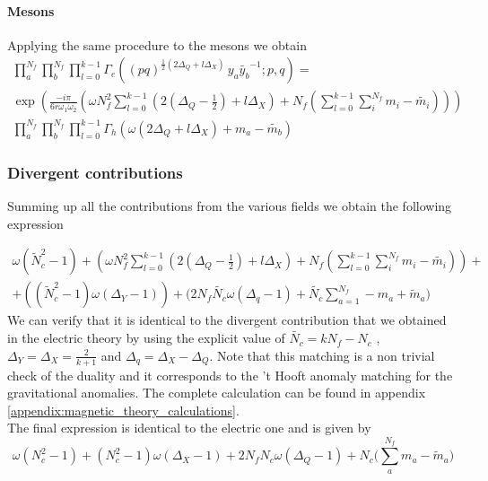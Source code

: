 \paragraph{Mesons}
Applying the same procedure to the mesons we obtain
\begin{multline}
\prod_a^{N_f} \prod_b^{N_f}  \prod_{l=0}^{k-1} \Gamma_e ( (pq)^{\frac{1}{2}\left( 2 \Delta_Q + l\Delta_X\right)} \, y_a \tilde{y_b}^{-1}; p ,q)  = \\
\exp \left( \frac{- i \pi }{6 r \omega_1 \omega_2} \left(  \omega  N_f^2 \sum _{l=0}^{k-1} \left(  2 \left( \Delta_Q - \frac{1}{2}\right) +  l \Delta_X   \right)  +N_f \left( \sum_{l=0}^{k-1} \sum_i^{N_f} m_i - \tilde{m_i}\right) \right) \right) \\
 \prod_a^{N_f} \prod_b^{N_f}  \prod_{l=0}^{k-1}  \Gamma_h \left( \omega ( 2 \Delta_Q + l \Delta_X) + m_a - \tilde{m_b} \right)
\end{multline}

\subsubsection{Divergent contributions}
Summing up all the contributions from the various fields we obtain the following expression

\begin{equation}
\begin{aligned}
	\omega (\tilde{N}_c^2 -1)
+
 \left(  \omega  N_f^2 \sum _{l=0}^{k-1} \left(  2 \left( \Delta_Q - \frac{1}{2}\right) +  l \Delta_X   \right)  +N_f \left( \sum_{l=0}^{k-1} \sum_i^{N_f} m_i - \tilde{m_i}\right) \right) + \\
 + \left( (\tilde{N}_c^2-1) \omega (\Delta_Y - 1)  \right)
 +\big( 2  N_f \tilde{N_c}\omega (\Delta_q - 1 ) +  \tilde{N_c} \sum_{a=1}^{N_f} - m_a + \tilde{m}_a \big) 
\end{aligned}
\end{equation}
We can verify that it is identical to the divergent contribution that we obtained in the electric theory by using the explicit value of $\tilde{N_c} = k N_f - N_c$ , $\Delta_Y = \Delta_X = \frac{2}{k+1}$ and $\Delta_q  = \Delta_X - \Delta_Q$.
Note that this matching is a non trivial check of the duality and it corresponds to the 't Hooft anomaly matching for the gravitational anomalies.
The complete calculation can be found in appendix \ref{appendix:magnetic_theory_calculations}.\\
The final expression is identical to the electric one and is given by
\begin{equation}
\omega ( N_c^2 -1 ) + ( N_c^2 - 1) \omega (\Delta_X  - 1 ) + 2 N_f N_c  \omega ( \Delta_Q -1 )  + N_c \big( \sum_a^{N_f} m_a - \tilde m_a  \big)
\end{equation}


